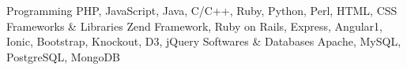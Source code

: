 \begin{cvskills}
  \cvskill
    {Programming}
    {PHP, JavaScript, Java, C/C++,  Ruby, Python, Perl, HTML, CSS}
  \cvskill
  {Frameworks \& Libraries}
  {Zend Framework, Ruby on Rails, Express, Angular1, Ionic, Bootstrap, Knockout, D3, jQuery}  
  \cvskill
  {Softwares \& Databases}
  {Apache, MySQL, PostgreSQL, MongoDB}      
    
\end{cvskills}
